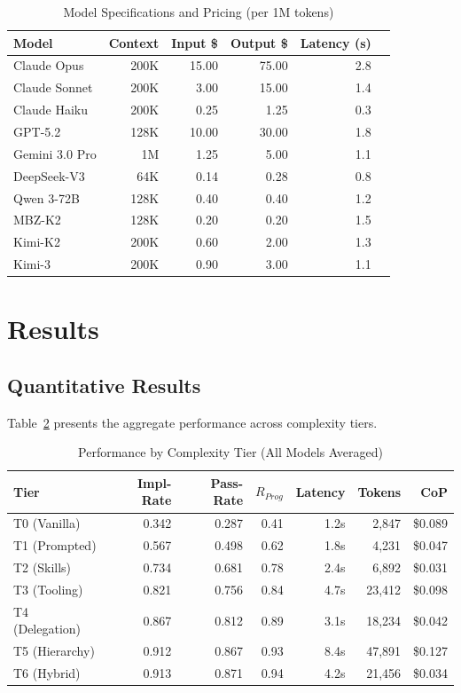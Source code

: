 \documentclass[11pt]{article}
\begin{document}
\begin{table}[H]
\centering
\caption{Model Specifications and Pricing (per 1M tokens)}
\label{tab:model-specs}
\begin{tabular}{lrrrrr}
\toprule
\textbf{Model} & \textbf{Context} & \textbf{Input \$} & \textbf{Output \$} & \textbf{Latency (s)} \\
\midrule
Claude Opus & 200K & 15.00 & 75.00 & 2.8 \\
Claude Sonnet & 200K & 3.00 & 15.00 & 1.4 \\
Claude Haiku & 200K & 0.25 & 1.25 & 0.3 \\
GPT-5.2 & 128K & 10.00 & 30.00 & 1.8 \\
Gemini 3.0 Pro & 1M & 1.25 & 5.00 & 1.1 \\
DeepSeek-V3 & 64K & 0.14 & 0.28 & 0.8 \\
Qwen 3-72B & 128K & 0.40 & 0.40 & 1.2 \\
MBZ-K2 & 128K & 0.20 & 0.20 & 1.5 \\
Kimi-K2 & 200K & 0.60 & 2.00 & 1.3 \\
Kimi-3 & 200K & 0.90 & 3.00 & 1.1 \\
\bottomrule
\end{tabular}
\end{table}

\section{Results}

\subsection{Quantitative Results}

Table~\ref{tab:tier-results} presents the aggregate performance across complexity tiers.

\begin{table}[H]
\centering
\caption{Performance by Complexity Tier (All Models Averaged)}
\label{tab:tier-results}
\begin{tabular}{lrrrrrr}
\toprule
\textbf{Tier} & \textbf{Impl-Rate} & \textbf{Pass-Rate} & \textbf{$R_{Prog}$} & \textbf{Latency} & \textbf{Tokens} & \textbf{CoP} \\
\midrule
T0 (Vanilla) & 0.342 & 0.287 & 0.41 & 1.2s & 2,847 & \$0.089 \\
T1 (Prompted) & 0.567 & 0.498 & 0.62 & 1.8s & 4,231 & \$0.047 \\
T2 (Skills) & 0.734 & 0.681 & 0.78 & 2.4s & 6,892 & \$0.031 \\
T3 (Tooling) & 0.821 & 0.756 & 0.84 & 4.7s & 23,412 & \$0.098 \\
T4 (Delegation) & 0.867 & 0.812 & 0.89 & 3.1s & 18,234 & \$0.042 \\
T5 (Hierarchy) & 0.912 & 0.867 & 0.93 & 8.4s & 47,891 & \$0.127 \\
T6 (Hybrid) & 0.913 & 0.871 & 0.94 & 4.2s & 21,456 & \$0.034 \\
\bottomrule
\end{tabular}
\end{table}
\end{document}
